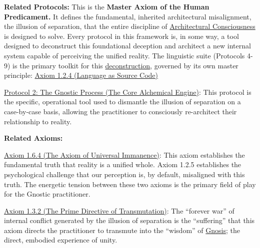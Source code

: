 \documentclass{article}
\begin{document}
\begin{nobullet}
    \item \textbf{Related Protocols:} This is the \textbf{Master Axiom of the Human Predicament.} It defines the fundamental, inherited architectural misalignment, the illusion of separation, that the entire discipline of \hyperlink{gloss:architectural_consciousness}{Architectural Consciousness} is designed to solve. Every protocol in this framework is, in some way, a tool designed to deconstruct this foundational deception and architect a new internal system capable of perceiving the unified reality. The linguistic suite (Protocols 4-9) is the primary toolkit for this \hyperlink{gloss:deconstruction}{deconstruction}, governed by its own master principle: \hyperref[axiom_1_2_4_language_as_source_code]{Axiom 1.2.4 (Language as Source Code)}
        \begin{nobullet}
            \item \hyperref[protocol_2_the_gnostic_process_the_core_alchemical_engine]{Protocol 2: The Gnostic Process (The Core Alchemical Engine)}: This protocol is the specific, operational tool used to dismantle the illusion of separation on a case-by-case basis, allowing the practitioner to consciously re-architect their relationship to reality.
        \end{nobullet}

    \item \textbf{Related Axioms:}
        \begin{nobullet}
            \item \hyperref[axiom_1_6_4_the_axiom_of_universal_immanence]{Axiom 1.6.4 (The Axiom of Universal Immanence)}: This axiom establishes the fundamental truth that reality is a unified whole. Axiom 1.2.5 establishes the psychological challenge that our perception is, by default, misaligned with this truth. The energetic tension between these two axioms is the primary field of play for the Gnostic practitioner.
            \item \hyperref[axiom_1_3_2_the_prime_directive_of_transmutation]{Axiom 1.3.2 (The Prime Directive of Transmutation)}: The ``forever war'' of internal conflict generated by the illusion of separation is the ``suffering'' that this axiom directs the practitioner to transmute into the ``wisdom'' of \hyperlink{gloss:gnosis}{Gnosis}; the direct, embodied experience of unity.
        \end{nobullet}

\end{nobullet}
\end{document}
